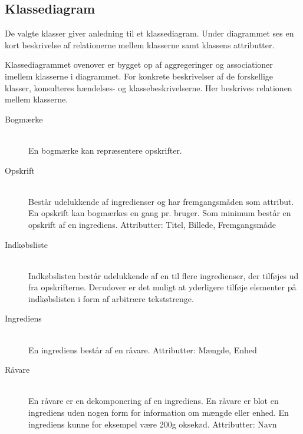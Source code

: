 \subsection{Klassediagram}

De valgte klasser giver anledning til et klassediagram. Under diagrammet ses en kort beskrivelse af relationerne mellem klasserne samt klassens attributter. 



Klassediagrammet ovenover er bygget op af aggregeringer og associationer imellem klasserne i diagrammet. For konkrete beskrivelser af de forskellige klasser, konsulteres hændelses- og klassebeskrivelserne. Her beskrives relationen mellem klasserne.

\begin{description}
  \item[Bogmærke] \hfill \\
    En bogmærke kan repræsentere opskrifter.

  \item[Opskrift] \hfill \\
    Består udelukkende af ingredienser og har fremgangsmåden som attribut. En opskrift kan bogmærkes en gang pr. bruger. Som minimum består en opskrift af en ingrediens.
Attributter: Titel, Billede, Fremgangsmåde

\item[Indkøbsliste] \hfill \\
  Indkøbslisten består udelukkende af en til flere ingredienser, der tilføjes ud fra opskrifterne. Derudover er det muligt at yderligere tilføje elementer på indkøbslisten i form af arbitrære tekststrenge.

\item[Ingrediens] \hfill \\
  En ingrediens består af en råvare.
Attributter: Mængde, Enhed

\item[Råvare] \hfill \\
  En råvare er en dekomponering af en ingrediens. En råvare er blot en ingrediens uden nogen form for information om mængde eller enhed. En ingrediens kunne for eksempel være 200g oksekød.
Attributter: Navn
\end{description}

